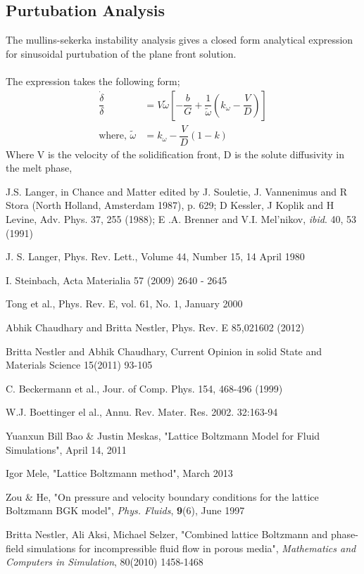 \documentclass[12pt,a4paper]{report}
\begin{document}
	\subsection{Purtubation Analysis}
	The mullins-sekerka instability analysis gives a closed form
	analytical expression for sinusoidal purtubation of the plane
	front solution.\\
	\\
	The expression takes the following form;
	\begin{align*}
		\dfrac{\dot{\delta}}{\delta} &= V\tilde{\omega}\left[-\dfrac{b}{G} + \dfrac{1}{\tilde{\omega}}\left(k_{\omega} - \dfrac{V}{D}\right)\right]\\
		\text{where,  }
		\tilde{\omega} &= k_{\omega} - \dfrac{V}{D}(1-k)
	\end{align*}
	Where V is the velocity of the solidification front, D is 
	the solute diffusivity in the melt phase, 
\begin{thebibliography}{1}
	
   J.S. Langer, in Chance and Matter edited by J. Souletie, J. Vannenimus 
	and R Stora (North Holland, Amsterdam 1987), p. 629; D Kessler, J Koplik and H Levine, Adv. 
	Phys. 37, 255 (1988); E .A. Brenner and V.I. Mel'nikov, \textit{ibid}. 40, 53 (1991)
	
   J. S. Langer, Phys. Rev. Lett., Volume 44, Number 15, 14 April 1980 

   I. Steinbach, Acta Materialia 57 (2009) 2640 - 2645

   Tong et al., Phys. Rev. E, vol. 61, No. 1, January 2000

   Abhik Chaudhary and Britta Nestler, Phys. Rev. E 85,021602 (2012)
  
   Britta Nestler and Abhik Chaudhary, Current Opinion in solid State 
  and Materials Science 15(2011) 93-105
  
   C. Beckermann et al., Jour. of Comp. Phys. 154, 468-496 (1999)
  
   W.J. Boettinger el al., Annu. Rev. Mater. Res. 2002. 32:163-94
  
   Yuanxun Bill Bao \& Justin Meskas, "Lattice Boltzmann Model for Fluid Simulations", April 14, 2011
  
   Igor Mele, "Lattice Boltzmann method", March 2013 
  
   Zou \& He, "On pressure and velocity boundary conditions for the lattice Boltzmann BGK model", {\em Phys. Fluids}, {\bf 9}(6), June 1997 
  
   Britta Nestler, Ali Aksi, Michael Selzer, "Combined lattice Boltzmann and phase-field simulations for incompressible fluid flow in porous media", {\em Mathematics and Computers in Simulation}, 80(2010) 1458-1468
	
\end{thebibliography}
\end{document}
